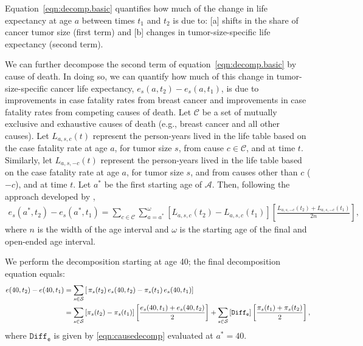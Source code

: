 \documentclass[11pt,letterpaper]{article}
\theoremstyle{plain}
\theoremstyle{remark}
\numberwithin{equation}{section}
\begin{document}
Equation~\ref{eqn:decomp.basic} quantifies how much of the change in life
expectancy at age $a$ between times $t_1$ and $t_2$ is due to: [a]
shifts in the share of cancer tumor size (first term) and [b] changes
in tumor-size-specific life expectancy (second term).

We can further decompose the second term of
equation~\ref{eqn:decomp.basic} by cause of death. In doing so, we can
quantify how much of this change in tumor-size-specific cancer life
expectancy, $e_s(a,t_2)-e_s(a,t_1)$, is due to improvements in case
fatality rates from breast cancer and improvements in case fatality
rates from  competing causes of death.  Let $\mathcal{C}$ be a set of
mutually exclusive and exhaustive causes of death (e.g., breast cancer
and all other causes).  Let $L_{a,s,c}(t)$ represent the person-years
lived in the life table based on the case fatality rate at age $a$,
for tumor size $s$, from cause $c\in\mathcal{C}$, and at time $t$.
Similarly, let $L_{a,s,-c}(t)$ represent the person-years lived in the
life table based on the case fatality rate at age $a$, for tumor size
$s$, and from causes other than $c$ ($-c$), and at time $t$.  Let $a^*$ be
the first starting age of $\mathcal{A}$.  Then, following the approach
developed by \cite{BelPreCan08},
\begin{eqnarray}
e_s(a^*,t_2)-e_s(a^*,t_1)= \sum_{c\in\mathcal{C}}\sum_{a=a^*}^\omega \left[L_{a,s,c}(t_2)-L_{a,s,c}(t_1) \right] \left[\frac{L_{a,s,-c}(t_2)+L_{a,s,-c}(t_1) }{2n} \right],
\label{eqn:causedecomp}
\end{eqnarray}
where $n$ is the width of the age interval and $\omega$ is the
starting age of the final and open-ended age interval.

We perform the decomposition starting at age 40; the final
decomposition equation equals:
\begin{align*}
  e(40,t_2)-e(40,t_1)&=\sum_{s\in\mathcal{S}}\left[\,\pi_s(t_2)\,e_s(40,t_2)- \pi_s(t_1)\,e_s(40,t_1)\right] \notag \\
                     &=\sum_{s\in\mathcal{S}}\left[\pi_s(t_2)-\pi_s(t_1) \right]\left[\frac{e_s(40,t_1)+e_s(40,t_2)}{2}\right]+\sum_{s\in\mathcal{S}}\left[\mathtt{Diff_e} \right]\left[\frac{\pi_s(t_1)+\pi_s(t_2)}{2}\right],
\end{align*}
where $\mathtt{Diff_e}$ is given by \eqref{eqn:causedecomp} evaluated at $a^*=40$.\\
\end{document}
